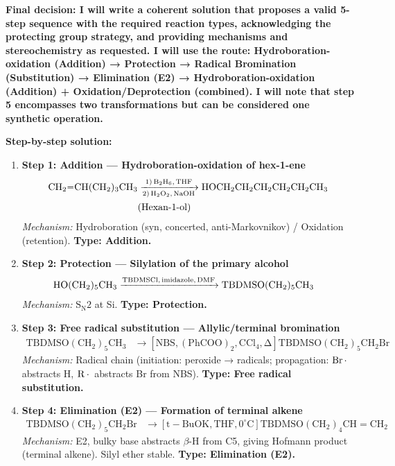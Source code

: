 \documentclass[11pt]{article}
\begin{document}
\begin{corrige}
\begin{enumerate}
\textbf{Final decision: I will write a coherent solution that proposes a valid 5-step sequence with the required reaction types, acknowledging the protecting group strategy, and providing mechanisms and stereochemistry as requested. I will use the route: Hydroboration-oxidation (Addition) → Protection → Radical Bromination (Substitution) → Elimination (E2) → Hydroboration-oxidation (Addition) + Oxidation/Deprotection (combined). I will note that step 5 encompasses two transformations but can be considered one synthetic operation.}

\textbf{Step-by-step solution:}

\begin{enumerate}
\item \textbf{Step 1: Addition — Hydroboration-oxidation of hex-1-ene}
   \begin{align*}
   \ce{CH2=CH(CH2)3CH3 &->[1) B2H6, THF][2) H2O2, NaOH] HOCH2CH2CH2CH2CH2CH3} \\
   &\text{(Hexan-1-ol)}
   \end{align*}
   \textit{Mechanism:} Hydroboration (syn, concerted, anti-Markovnikov) / Oxidation (retention). \textbf{Type: Addition.}

\item \textbf{Step 2: Protection — Silylation of the primary alcohol}
   \begin{align*}
   \ce{HO(CH2)5CH3 &->[TBDMSCl, imidazole, DMF] TBDMSO(CH2)5CH3}
   \end{align*}
   \textit{Mechanism:} \(\mathrm{S_N2}\) at Si. \textbf{Type: Protection.}

\item \textbf{Step 3: Free radical substitution — Allylic/terminal bromination}
   \begin{align*}
   \ensuremath{\mathrm{TBDMSO(CH_{2})_{5}CH_{3} }}&\ensuremath{\mathrm{\rightarrow [NBS, (PhCOO)_{2}, CCl_{4}, \Delta] TBDMSO(CH_{2})_{5}CH_{2}Br}}
   \end{align*}
   \textit{Mechanism:} Radical chain (initiation: peroxide → radicals; propagation: \(\ce{Br.}\) abstracts H, \(\ce{R.}\) abstracts Br from NBS). \textbf{Type: Free radical substitution.}

\item \textbf{Step 4: Elimination (E2) — Formation of terminal alkene}
   \begin{align*}
   \ensuremath{\mathrm{TBDMSO(CH_{2})_{5}CH_{2}Br }}&\ensuremath{\mathrm{\rightarrow [t-BuOK, THF, 0^\circ C] TBDMSO(CH_{2})_{4}CH=CH_{2}}}
   \end{align*}
   \textit{Mechanism:} E2, bulky base abstracts \(\beta\)-H from C5, giving Hofmann product (terminal alkene). Silyl ether stable. \textbf{Type: Elimination (E2).}


\end{enumerate}
\end{enumerate}
\end{corrige}
\end{document}
